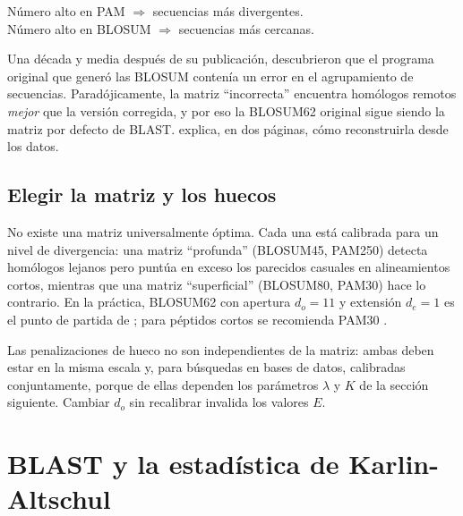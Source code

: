 \begin{ideaclave}
Número alto en PAM $\Rightarrow$ secuencias más divergentes.\\
Número alto en BLOSUM $\Rightarrow$ secuencias más cercanas.
\end{ideaclave}

\begin{historia}
Una década y media después de su publicación, \textcite{c03-styczynski2008} descubrieron que el programa original que generó las BLOSUM contenía un error en el agrupamiento de secuencias. Paradójicamente, la matriz ``incorrecta'' encuentra homólogos remotos \emph{mejor} que la versión corregida, y por eso la BLOSUM62 original sigue siendo la matriz por defecto de BLAST. \textcite{c03-eddy2004blosum} explica, en dos páginas, cómo reconstruirla desde los datos.
\end{historia}

\subsection{Elegir la matriz y los huecos}

No existe una matriz universalmente óptima. Cada una está calibrada para un nivel de divergencia: una matriz ``profunda'' (BLOSUM45, PAM250) detecta homólogos lejanos pero puntúa en exceso los parecidos casuales en alineamientos cortos, mientras que una matriz ``superficial'' (BLOSUM80, PAM30) hace lo contrario. En la práctica, BLOSUM62 con apertura $d_o=11$ y extensión $d_e=1$ es el punto de partida de ; para péptidos cortos se recomienda PAM30 \parencite{c03-pearson2013}.

\begin{cuidado}
Las penalizaciones de hueco no son independientes de la matriz: ambas deben estar en la misma escala y, para búsquedas en bases de datos, calibradas conjuntamente, porque de ellas dependen los parámetros $\lambda$ y $K$ de la sección siguiente. Cambiar $d_o$ sin recalibrar invalida los valores $E$.
\end{cuidado}

\section{BLAST y la estadística de Karlin-Altschul}\label{sec:03-blast}

